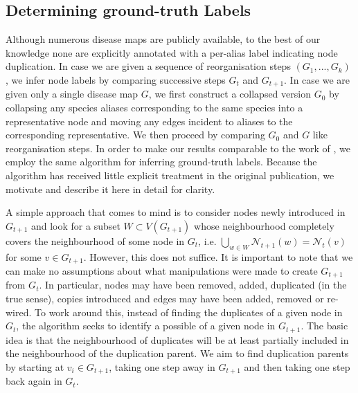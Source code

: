 \documentclass[
	fontsize=10pt, %
	twoside=false, %
	secnumdepth=1, %
]{kaobook}
\begin{document}
\subsection{Determining ground-truth Labels}
Although numerous disease maps are publicly available, to the best of our
knowledge none are explicitly annotated with a per-alias label indicating node
duplication. In case we are given a sequence of reorganisation steps $(G_1, ...,
G_k)$ , we infer node labels by comparing successive steps $G_t$ and $G_{t+1}$.
In
case we are given only a single disease map $G$, we first construct a collapsed
version $G_0$ by collapsing any species aliases
corresponding to the same species into a representative node and moving any edges
incident to aliases to the corresponding representative. We then proceed by
comparing $G_0$ and $G$ like reorganisation steps.
%
In order to make our results comparable to the work of
\citeauthor{nielsen_MachineLearningSupport_2019}
\cite{nielsen_MachineLearningSupport_2019}, we employ the same algorithm for
inferring ground-truth labels. Because the algorithm has received little
explicit treatment in the original publication, we motivate and describe it here
in detail for clarity.
%

A simple approach that comes to mind is to consider nodes newly introduced in
$G_{t+1}$ and look for a subset $W \subset V(G_{t+1})$ whose neighbourhood
completely covers the neighbourhood of some node in $G_{t}$, i.e. $\bigcup_{w
  \in W} \mathcal{N}_{t+1}(w) = \mathcal{N}_t(v)$ for some $v \in G_{t+1}$.
However, this does not suffice. It is important to note that we can make no
assumptions about what manipulations were made to create $G_{t+1}$ from $G_t$.
In particular, nodes may have been removed, added, duplicated (in the true
sense), copies introduced and edges may have been added, removed or re-wired.
%
To work around this, instead of finding the duplicates of a given node in
$G_{t}$, the algorithm seeks to identify a possible  of
a given node in $G_{t+1}$. The basic idea is that the neighbourhood of
duplicates will be at least partially included in the neighbourhood of the
duplication parent. We aim to find duplication parents by starting at $v_i \in
G_{t+1}$, taking one step away in $G_{t+1}$ and then taking one step back again
in $G_t$. 
\end{document}
